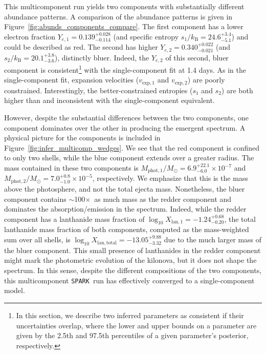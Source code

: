\documentclass[twocolumn,twocolappendix]{aastex63}
\def\SPARK{\texttt{SPARK}}
\begin{document}
{{{{{{This multicomponent run yields two components with substantially different abundance patterns. A comparison of the abundance patterns is given in Figure~\ref{fig:abunds_components_compare}. The first component has a lower electron fraction $Y_{e,1} = 0.139^{+0.028}_{-0.114}$ (and specific entropy $s_1 / k_{\mathrm{B}} = 24.6^{+3.4}_{-5.1}$) and could be described as red. The second has higher $Y_{e,2} = 0.340^{+0.022}_{-0.021}$ (and $s_2 / k_{\mathrm{B}} = 20.1^{+3.8}_{-3.6}$), distinctly bluer. Indeed, the $Y_{e,2}$ of this second, bluer component is consistent\footnote{In this section, we describe two inferred parameters as consistent if their uncertainties overlap, where the lower and upper bounds on a parameter are given by the 2.5th and 97.5th percentiles of a given parameter's posterior, respectively.} with the single-component fit at 1.4 days. As in the single-component fit, expansion velocities ($v_{\mathrm{exp},1}$ and $v_{\mathrm{exp},2}$) are poorly constrained.  Interestingly, the better-constrained entropies ($s_1$ and $s_2$) are both higher than and inconsistent with the single-component equivalent.

However, despite the substantial differences between the two components, one component dominates over the other in producing the emergent spectrum. A physical picture for the components is included in Figure~\ref{fig:infer_multicomp_wedges}. We see that the red component is confined to only two shells, while the blue component extends over a greater radius. The mass contained in these two components is $M_{\mathrm{phot},1}/M_{\odot} = 6.9^{+22.1}_{-6.0} \times 10^{-7}$ and $M_{\mathrm{phot},2}/M_{\odot} = 7.0^{+0.8}_{-1.0} \times 10^{-5}$, respectively. We emphasize that this is the mass above the photosphere, and not the total ejecta mass. Nonetheless, the bluer component contains $\sim$100$\times$~as much mass as the redder component and dominates the absorption/emission in the spectrum. Indeed, while the redder component has a lanthanide mass fraction of $\log_{10} X_{\mathrm{lan},1} = -1.24^{+0.68}_{-0.20}$, the total lanthanide mass fraction of both components, computed as the mass-weighted sum over all shells, is $\log_{10} X_{\mathrm{lan,total}} = -13.05^{+9.88}_{-3.32}$ due to the much larger mass of the bluer component. This small presence of lanthanides in the redder component might mark the photometric evolution of the kilonova, but it does not shape the spectrum. In this sense, despite the different compositions of the two components, this multicomponent \SPARK~run has effectively converged to a single-component model.




}}}}}}
\end{document}

